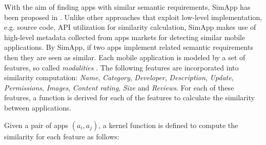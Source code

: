 With the aim of finding apps with similar semantic requirements, SimApp has been proposed in \cite{Chen:2015:SFD:2684822.2685305}. Unlike other approaches that exploit low-level implementation, e.g. source code, API utilization for similarity calculation, SimApp makes use of high-level metadata collected from apps markets for detecting similar mobile applications. By SimApp, if two apps implement related semantic requirements then they are seen as similar. Each mobile application is modeled by a set of features, so called \emph{modalities}	. The following features are incorporated into similarity computation: \emph{Name}, \emph{Category}, \emph{Developer}, \emph{Description}, \emph{Update}, \emph{Permissions}, \emph{Images}, \emph{Content rating}, \emph{Size} and \emph{Reviews}. For each of these features, a function is derived for each of the features to calculate the similarity between applications.

Given a pair of apps $(a_{i},a_{j})$, a kernel function is defined to compute the similarity for each feature as follows: 

